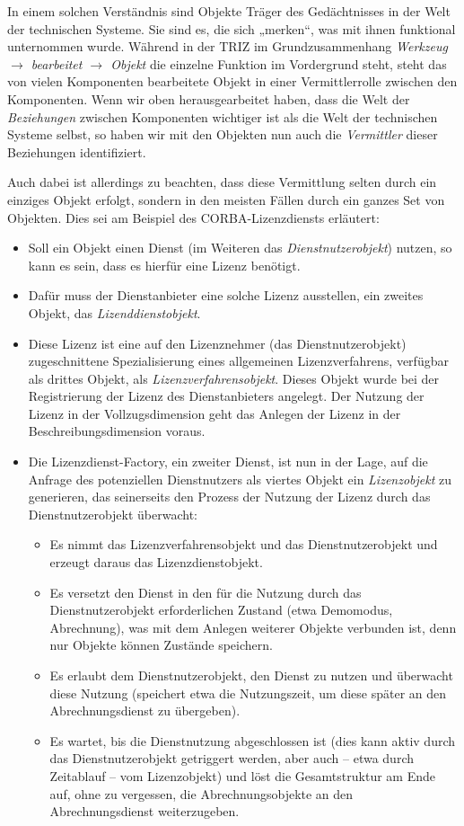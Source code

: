 \documentclass[12pt,a4paper]{article}
\begin{document}
In einem solchen Verständnis sind Objekte Träger des Gedächtnisses in der Welt
der technischen Systeme. Sie sind es, die sich „merken“, was mit ihnen
funktional unternommen wurde.  Während in der TRIZ im Grundzusammenhang
\emph{Werkzeug $\to$ bearbeitet $\to$ Objekt} die einzelne Funktion im
Vordergrund steht, steht das von vielen Komponenten bearbeitete Objekt in
einer Vermittlerrolle zwischen den Komponenten. Wenn wir oben herausgearbeitet
haben, dass die Welt  der \emph{Beziehungen} zwischen Komponenten wichtiger
ist als die Welt der technischen Systeme selbst, so haben wir mit den Objekten
nun auch die \emph{Vermittler} dieser Beziehungen identifiziert.

Auch dabei ist allerdings zu beachten, dass diese Vermittlung selten durch ein
einziges Objekt erfolgt, sondern in den meisten Fällen durch ein ganzes Set
von Objekten. Dies sei  am Beispiel des CORBA-Lizenzdiensts
\cite[S. 242]{Szyperski2002} erläutert:
\begin{itemize}
\item Soll ein Objekt einen Dienst (im Weiteren das \emph{Dienstnutzerobjekt})
  nutzen, so kann es sein, dass es hierfür eine Lizenz benötigt.
\item Dafür muss der Dienstanbieter eine solche Lizenz ausstellen, ein zweites
  Objekt, das \emph{Lizenddienstobjekt}.
\item Diese Lizenz ist eine auf den Lizenznehmer (das Dienstnutzerobjekt)
  zugeschnittene Spezialisierung eines allgemeinen Lizenzverfahrens, verfügbar
  als drittes Objekt, als \emph{Lizenzverfahrensobjekt}.  Dieses Objekt wurde
  bei der Registrierung der Lizenz des Dienstanbieters angelegt. Der Nutzung
  der Lizenz in der Vollzugsdimension geht das Anlegen der Lizenz in der
  Beschreibungsdimension voraus.
\item Die Lizenzdienst-Factory, ein zweiter Dienst, ist nun in der Lage, auf
  die Anfrage des potenziellen Dienstnutzers als viertes Objekt ein
  \emph{Lizenzobjekt} zu generieren, das seinerseits den Prozess der Nutzung
  der Lizenz durch das Dienstnutzerobjekt überwacht:
  \begin{itemize}
  \item Es nimmt das Lizenzverfahrensobjekt und das Dienstnutzerobjekt und
    erzeugt daraus das Lizenzdienstobjekt.
  \item Es versetzt den Dienst in den für die Nutzung durch das
    Dienstnutzerobjekt erforderlichen Zustand (etwa Demomodus, Abrechnung),
    was mit dem Anlegen weiterer Objekte verbunden ist, denn nur Objekte
    können Zustände speichern. 
  \item Es erlaubt dem Dienstnutzerobjekt, den Dienst zu nutzen und überwacht
    diese Nutzung (speichert etwa die Nutzungszeit, um diese später an den
    Abrechnungsdienst zu übergeben).
  \item Es wartet, bis die Dienstnutzung abgeschlossen ist (dies kann aktiv
    durch das Dienstnutzerobjekt getriggert werden, aber auch -- etwa durch
    Zeitablauf -- vom Lizenzobjekt) und löst die Gesamtstruktur am Ende auf,
    ohne zu vergessen, die Abrechnungsobjekte an den Abrechnungsdienst
    weiterzugeben.  
  \end{itemize}
\end{itemize}
\end{document}
